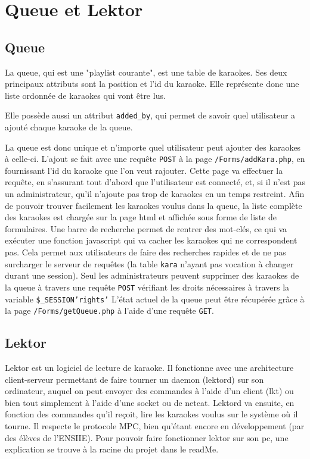 \section{Queue et Lektor}
\subsection{Queue}

La queue, qui est une "playlist courante", est une table de karaokes. Ses deux principaux attributs sont la position et l'id du karaoke. Elle représente donc une liste ordonnée de karaokes qui vont être lus.

Elle possède aussi un attribut \texttt{added\_by}, qui permet de savoir quel utilisateur a ajouté chaque karaoke de la queue.

La queue est donc unique et n'importe quel utilisateur peut ajouter des karaokes à celle-ci.
L'ajout se fait avec une requête \texttt{POST} à la page \texttt{/Forms/addKara.php}, en fournissant l'id du karaoke que l'on veut rajouter. Cette page va effectuer la requête, en s'assurant tout d'abord que l'utilisateur est connecté, et, si il n'est pas un administrateur, qu'il n'ajoute pas trop de karaokes en un temps restreint.
Afin de pouvoir trouver facilement les karaokes voulus dans la queue, la liste complète des karaokes est chargée sur la page html et affichée sous forme de liste de formulaires. Une barre de recherche permet de rentrer des mot-clés, ce qui va exécuter une fonction javascript qui va cacher les karaokes qui ne correspondent pas. Cela permet aux utilisateurs de faire des recherches rapides et de ne pas surcharger le serveur de requêtes (la table \texttt{kara} n'ayant pas vocation à changer durant une
session).
Seul les administrateurs peuvent supprimer des karaokes de la queue à travers une requête \texttt{POST} vérifiant les droits nécessaires à travers la variable \texttt{\$\_SESSION{\lbrack'rights'\rbrack}} 
L'état actuel de la queue peut être récupérée grâce à la page \texttt{/Forms/getQueue.php} à l'aide d'une requête \texttt{GET}.

\subsection{Lektor}

Lektor est un logiciel de lecture de karaoke. Il fonctionne avec une architecture client-serveur permettant de faire tourner un daemon (lektord) sur son ordinateur, auquel on peut envoyer des commandes à l'aide d'un client (lkt) ou bien tout simplement à l'aide d'une socket ou de netcat. Lektord va ensuite, en fonction des commandes qu'il reçoit, lire les karaokes voulus sur le système où il tourne. Il respecte le protocole MPC, bien qu'étant encore en développement (par des élèves de
l'ENSIIE).\newline
Pour pouvoir faire fonctionner lektor sur son pc, une explication se trouve à la racine du projet dans le readMe.\newline

